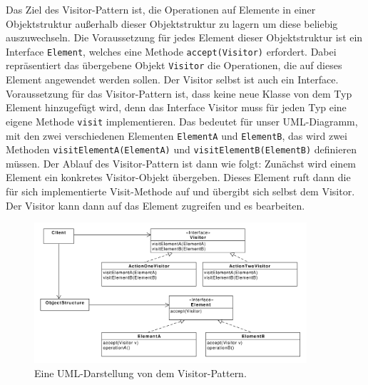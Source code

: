 
Das Ziel des Visitor-Pattern ist, die Operationen auf Elemente in einer Objektstruktur außerhalb dieser Objektstruktur zu lagern um diese beliebig auszuwechseln.
Die Voraussetzung für jedes Element dieser Objektstruktur ist ein Interface \texttt{Element}, welches eine Methode \texttt{accept(Visitor)} erfordert. Dabei repräsentiert das übergebene Objekt \texttt{Visitor} die Operationen, die auf dieses Element angewendet werden sollen. Der Visitor selbst ist auch ein Interface. Voraussetzung für das Visitor-Pattern ist, dass keine neue Klasse von dem Typ Element hinzugefügt wird, denn das Interface Visitor muss für jeden Typ eine eigene Methode \texttt{visit} implementieren. Das bedeutet für unser UML-Diagramm, mit den zwei verschiedenen Elementen \texttt{ElementA} und \texttt{ElementB}, das wird zwei Methoden \texttt{visitElementA(ElementA)} und \texttt{visitElementB(ElementB)} definieren müssen. 
Der Ablauf des Visitor-Pattern ist dann wie folgt: Zunächst wird einem Element ein konkretes Visitor-Objekt übergeben. Dieses Element ruft dann die für sich implementierte Visit-Methode auf und übergibt sich selbst dem Visitor. Der Visitor kann dann auf das Element zugreifen und es bearbeiten.

\begin{figure}[htbp]
\centering
\includegraphics[width=0.9\textwidth]{./paper/visitor/visitor}
\caption{Eine UML-Darstellung von dem Visitor-Pattern.}
\label{visitordiagramm}
\end{figure} 
